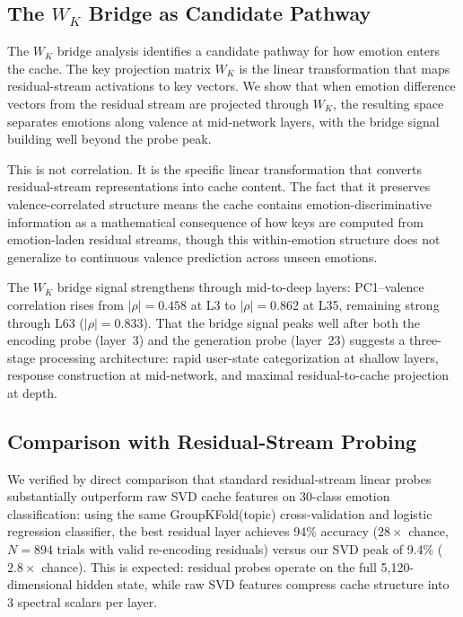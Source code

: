 \documentclass[11pt,a4paper]{article}
\begin{document}
\subsection{The $W_K$ Bridge as Candidate Pathway}

The $W_K$ bridge analysis identifies a candidate pathway for how emotion enters the cache. The key projection matrix $W_K$ is the linear transformation that maps residual-stream activations to key vectors. We show that when emotion difference vectors from the residual stream are projected through $W_K$, the resulting space separates emotions along valence at mid-network layers, with the bridge signal building well beyond the probe peak.

This is not correlation. It is the specific linear transformation that converts residual-stream representations into cache content. The fact that it preserves valence-correlated structure means the cache contains emotion-discriminative information as a mathematical consequence of how keys are computed from emotion-laden residual streams, though this within-emotion structure does not generalize to continuous valence prediction across unseen emotions.

The $W_K$ bridge signal strengthens through mid-to-deep layers: PC1--valence correlation rises from $|\rho| = 0.458$ at L3 to $|\rho| = 0.862$ at L35, remaining strong through L63 ($|\rho| = 0.833$). That the bridge signal peaks well after both the encoding probe (layer~3) and the generation probe (layer~23) suggests a three-stage processing architecture: rapid user-state categorization at shallow layers, response construction at mid-network, and maximal residual-to-cache projection at depth.

\subsection{Comparison with Residual-Stream Probing}

We verified by direct comparison that standard residual-stream linear probes substantially outperform raw SVD cache features on 30-class emotion classification: using the same GroupKFold(topic) cross-validation and logistic regression classifier, the best residual layer achieves 94\% accuracy ($28\times$ chance, $N = 894$ trials with valid re-encoding residuals) versus our SVD peak of 9.4\% ($2.8\times$ chance). This is expected: residual probes operate on the full 5{,}120-dimensional hidden state, while raw SVD features compress cache structure into 3 spectral scalars per layer.
\end{document}

